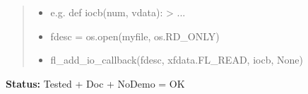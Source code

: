 \begin{boxedminipage}{\funcwidth}
\begin{quote}
\begin{itemize}
  \item
    \setlength{\parskip}{0.6ex}

e.g. def iocb(num, vdata): > ...


  \item 
fdesc = os.open(myfile, os.RD\_ONLY)


  \item 
fl\_add\_io\_callback(fdesc, xfdata.FL\_READ, iocb, None)


\end{itemize}

\end{quote}

\textbf{Status:} 
Tested + Doc + NoDemo = OK


    \end{boxedminipage}

    \label{xformslib:flbasic:fl_remove_io_callback}

    \vspace{0.5ex}


